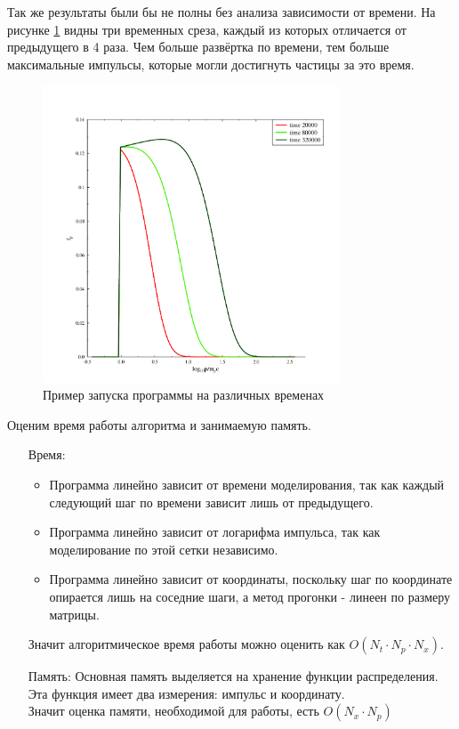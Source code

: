 \documentclass[a4paper,14pt]{extarticle} %
\begin{document}
Так же результаты были бы не полны без анализа зависимости от времени. На рисунке \ref{res/razn/times} видны три временных среза, каждый из которых отличается от предыдущего в 4 раза. Чем больше развёртка по времени, тем больше максимальные импульсы, которые могли достигнуть частицы за это время.
\begin{figure}[H]
\centering
\includegraphics[width=250pt]{r_times}
\caption{Пример запуска программы на различных временах}
\label{res/razn/times}
\end{figure}

Оценим время работы алгоритма и занимаемую память.
\begin{enumerate}
\item[Время:] 
\begin{itemize}
\item Программа линейно зависит от времени моделирования, так как каждый следующий шаг по времени зависит лишь от предыдущего.
\item Программа линейно зависит от логарифма импульса, так как моделирование по этой сетки независимо.
\item Программа линейно зависит от координаты, поскольку шаг по координате опирается лишь на соседние шаги, а метод прогонки - линеен по размеру матрицы.
\end{itemize}
Значит алгоритмическое время работы можно оценить как $O(N_t\cdot N_p\cdot N_x)$.
\item[Память:] Основная память выделяется на хранение функции распределения. Эта функция имеет два измерения: импульс и координату.\\
Значит оценка памяти, необходимой для работы, есть $O(N_x\cdot N_p)$
\end{enumerate}
\end{document}

